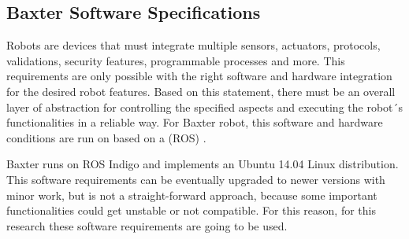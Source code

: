 \documentclass[11pt]{report} %
\begin{document}
\begin{table}[H]
\begin{center}
\caption{\label{tab:additional_specifications} Additional specifications for Baxter robot. Adapted from \citep{cite_baxter_hardware_specifications}.}
\end{center}
\end{table}


\subsection{Baxter Software Specifications}

Robots are devices that must integrate multiple sensors, actuators, protocols, validations, security features, programmable processes and more. This requirements are only possible with the right software and hardware integration for the desired robot features. Based on this statement, there must be an overall layer of abstraction for controlling the specified aspects and executing the robot´s functionalities in a reliable way. For Baxter robot, this software and hardware conditions are run on based on a  (ROS) \citep{cite_ROS_official_site}.

Baxter runs on ROS Indigo and implements an Ubuntu 14.04 Linux distribution. This software requirements can be eventually upgraded to newer versions with minor work, but is not a straight-forward approach, because some important functionalities could get unstable or not compatible. For this reason, for this research these software requirements are going to be used.\\
\end{document}
